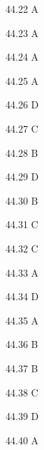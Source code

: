 \begin{Solution}{44.{22}}
A
\end{Solution}
\begin{Solution}{44.{23}}
A
\end{Solution}
\begin{Solution}{44.{24}}
A
\end{Solution}
\begin{Solution}{44.{25}}
A
\end{Solution}
\begin{Solution}{44.{26}}
D
\end{Solution}
\begin{Solution}{44.{27}}
C
\end{Solution}
\begin{Solution}{44.{28}}
B
\end{Solution}
\begin{Solution}{44.{29}}
D
\end{Solution}
\begin{Solution}{44.{30}}
B
\end{Solution}
\begin{Solution}{44.{31}}
C
\end{Solution}
\begin{Solution}{44.{32}}
C
\end{Solution}
\begin{Solution}{44.{33}}
A
\end{Solution}
\begin{Solution}{44.{34}}
D
\end{Solution}
\begin{Solution}{44.{35}}
A
\end{Solution}
\begin{Solution}{44.{36}}
B
\end{Solution}
\begin{Solution}{44.{37}}
B
\end{Solution}
\begin{Solution}{44.{38}}
C
\end{Solution}
\begin{Solution}{44.{39}}
D
\end{Solution}
\begin{Solution}{44.{40}}
A
\end{Solution}
